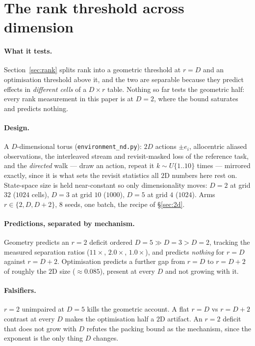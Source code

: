 \section{The rank threshold across dimension}
\label{sec:nd}


\paragraph{What it tests.} Section~\ref{sec:rank} splits rank into a geometric
threshold at $r=D$ and an optimisation threshold above it, and the two are
separable because they predict effects in \emph{different cells} of a
$D\times r$ table. Nothing so far tests the geometric half: every rank
measurement in this paper is at $D=2$, where the bound saturates and predicts
nothing.

\paragraph{Design.} A $D$-dimensional torus (\texttt{environment\_nd.py}): $2D$
actions $\pm e_i$, allocentric aliased observations, the interleaved stream and
revisit-masked loss of the reference task, and the \emph{directed} walk --- draw
an action, repeat it $k\sim U\{1..10\}$ times --- mirrored exactly, since it is
what sets the revisit statistics all $2$D numbers here rest on. State-space size
is held near-constant so only dimensionality moves: $D=2$ at grid $32$ ($1024$
cells), $D=3$ at grid $10$ ($1000$), $D=5$ at grid $4$ ($1024$). Arms
$r\in\{2,D,D{+}2\}$, $8$ seeds, one batch, the recipe of \S\ref{sec:2d}.

\paragraph{Predictions, separated by mechanism.} Geometry predicts an $r=2$
deficit ordered $D{=}5\gg D{=}3>D{=}2$, tracking the measured separation ratios
($11\times$, $2.0\times$, $1.0\times$), and predicts \emph{nothing} for $r=D$
against $r=D{+}2$. Optimisation predicts a further gap from $r=D$ to $r=D{+}2$ of
roughly the $2$D size ($\approx 0.085$), present at every $D$ and not growing
with it.

\paragraph{Falsifiers.} $r=2$ unimpaired at $D=5$ kills the geometric account.
A flat $r{=}D$ vs $r{=}D{+}2$ contrast at every $D$ makes the optimisation half a
$2$D artifact. An $r=2$ deficit that does not grow with $D$ refutes the packing
bound as the mechanism, since the exponent is the only thing $D$ changes.

